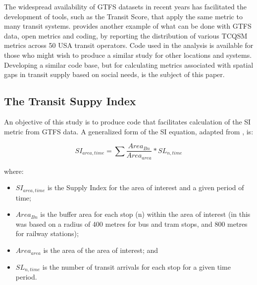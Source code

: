 \documentclass[preprint, 3p,
authoryear]{elsarticle} %
\begin{document}
The widespread availability of GTFS datasets in recent years has
facilitated the development of tools, such as the Transit Score, that
apply the same metric to many transit systems. \citet{Wong:2013aa}
provides another example of what can be done with GTFS data, open
metrics and coding, by reporting the distribution of various TCQSM
metrics across 50 USA transit operators. Code used in the
\citet{Wong:2013aa} analysis is available for those who might wish to
produce a similar study for other locations and systems. Developing a
similar code base, but for calculating metrics associated with spatial
gaps in transit supply based on social needs, is the subject of this
paper.

\subsection{The Transit Suppy Index}\label{the-transit-suppy-index}

An objective of this study is to produce code that facilitates
calculation of the SI metric from GTFS data. A generalized form of the
SI equation, adapted from \citet{currie2010identifying}, is:

\[SI_{area, time} = \sum{\frac{Area_{Bn}}{Area_{area}}*SL_{n, time}}\]

where:

\begin{itemize}
\item
  \(SI_{area, time}\) is the Supply Index for the area of interest and a
  given period of time;
\item
  \(Area_{Bn}\) is the buffer area for each stop (n) within the area of
  interest (in \citet{currie2010identifying} this was based on a radius
  of 400 metres for bus and tram stops, and 800 metres for railway
  stations);
\item
  \(Area_{area}\) is the area of the area of interest; and
\item
  \(SL_{n,time}\) is the number of transit arrivals for each stop for a
  given time period.
\end{itemize}
\end{document}
